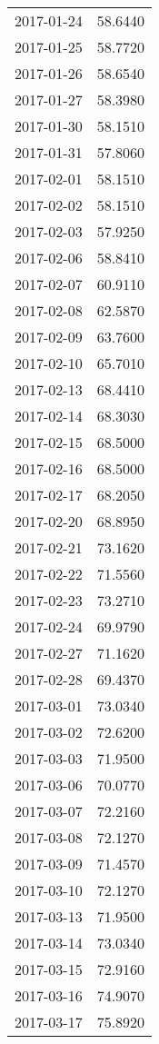\begin{tabular}{lr}
2017-01-24 &     58.6440 \\
2017-01-25 &     58.7720 \\
2017-01-26 &     58.6540 \\
2017-01-27 &     58.3980 \\
2017-01-30 &     58.1510 \\
2017-01-31 &     57.8060 \\
2017-02-01 &     58.1510 \\
2017-02-02 &     58.1510 \\
2017-02-03 &     57.9250 \\
2017-02-06 &     58.8410 \\
2017-02-07 &     60.9110 \\
2017-02-08 &     62.5870 \\
2017-02-09 &     63.7600 \\
2017-02-10 &     65.7010 \\
2017-02-13 &     68.4410 \\
2017-02-14 &     68.3030 \\
2017-02-15 &     68.5000 \\
2017-02-16 &     68.5000 \\
2017-02-17 &     68.2050 \\
2017-02-20 &     68.8950 \\
2017-02-21 &     73.1620 \\
2017-02-22 &     71.5560 \\
2017-02-23 &     73.2710 \\
2017-02-24 &     69.9790 \\
2017-02-27 &     71.1620 \\
2017-02-28 &     69.4370 \\
2017-03-01 &     73.0340 \\
2017-03-02 &     72.6200 \\
2017-03-03 &     71.9500 \\
2017-03-06 &     70.0770 \\
2017-03-07 &     72.2160 \\
2017-03-08 &     72.1270 \\
2017-03-09 &     71.4570 \\
2017-03-10 &     72.1270 \\
2017-03-13 &     71.9500 \\
2017-03-14 &     73.0340 \\
2017-03-15 &     72.9160 \\
2017-03-16 &     74.9070 \\
2017-03-17 &     75.8920 \\

\end{tabular}
